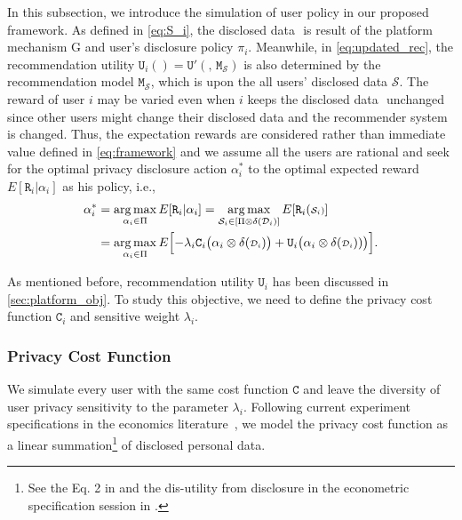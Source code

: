 In this subsection, we introduce the simulation of user policy in our proposed framework.
As defined in \cref{eq:S_i}, the disclosed data $\si{}$ is result of the platform mechanism $\mathrm{G}$ and user's disclosure policy $\pi_i$. 
Meanwhile, in \cref{eq:updated_rec}, the recommendation utility $\texttt{U}_i( \si{})=\texttt{U}'(\si{},\, \texttt{M}_{{\scriptscriptstyle \mathcal{S}}})$ is also determined by the recommendation model $\texttt{M}_{{\scriptscriptstyle \mathcal{S}}}$, which is  upon the all users' disclosed data $\mathcal{S}$. 
The reward of user $i$ may be varied even when $i$ keeps the disclosed data $\si{}$ unchanged since other users might change their disclosed data and the recommender system is changed.
Thus, the expectation rewards are considered rather than immediate value defined in \cref{eq:framework} and we assume all the users are rational and seek for the optimal privacy disclosure action  $\alpha_i^*$ to the optimal expected reward $E[ \texttt{R}_i | \alpha_i ] $ as his policy, i.e., %
\begin{equation}
    \begin{aligned}
    \alpha_i^{*} &= \operatorname*{arg\,max}_{\alpha_i \in \Pi} E[ \texttt{R}_i | \alpha_i ]=  \operatorname*{arg\,max}_{{\scriptstyle \mathcal{S}_i\in [ \Pi \otimes \mathrm{\delta}({\scriptstyle \mathcal{D}_i}) ] }} E[ \texttt{R}_i({\scriptstyle \mathcal{S}_i)} ] \\
& =\operatorname*{arg\,max}_{\alpha_i \in \Pi } E\Bigl[ -\lambda_i \texttt{C}_i\bigl( \alpha_i \otimes \mathrm{\delta}({\scriptstyle \mathcal{D}_i}) \bigr) + \texttt{U}_i\bigl( \alpha_i \otimes \mathrm{\delta}({\scriptstyle \mathcal{D}_i}) )\bigr) \Bigr].
    \end{aligned}
\label{eq:opt_pi}
\end{equation}

As mentioned before, recommendation utility $\texttt{U}_i$ has been discussed in \cref{sec:platform_obj}.
To study this objective, we need to define the privacy cost function $\texttt{C}_i$ and sensitive weight $\lambda_i$.



\subsubsection{\textbf{Privacy Cost Function}}
\label{sec:privacy_cost}
We simulate every user with the same cost function $\texttt{C}$ and leave the diversity of user privacy sensitivity to the parameter $\lambda_i$. 
Following current experiment specifications in the economics literature~\cite{lin2019valuing,tang2019value}, we model the privacy cost function as a linear summation\footnote{See the Eq. 2 in \cite{lin2019valuing} and the dis-utility from disclosure in the econometric specification session in \cite{tang2019value}.} of disclosed personal data.


